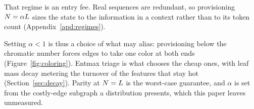That regime is an entry fee. Real sequences are redundant, so provisioning $N = \alpha L$ sizes the state to the information in a context rather than to its token count (Appendix~\ref{apd:regimes}).

Setting $\alpha < 1$ is thus a choice of what may alias: provisioning below the chromatic number forces edges to take one color at both ends (Figure~\ref{fig:coloring}). Entmax triage is what chooses the cheap ones, with leaf mass decay metering the turnover of the features that stay hot (Section~\ref{sec:decay}). Parity at $N = L$ is the worst-case guarantee, and $\alpha$ is set from the costly-edge subgraph a distribution presents, which this paper leaves unmeasured.

